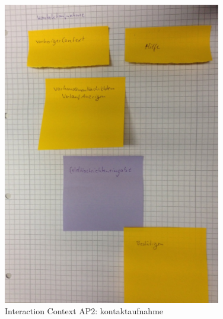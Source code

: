 \begin{figure}[H]
\centering
\includegraphics[angle=90, width=0.85\textwidth] {./images/abstract/version2/kontaktaufnahme.JPG}
\caption{Interaction Context AP2: kontaktaufnahme}
\label{interfaceContents46}
\end{figure}

